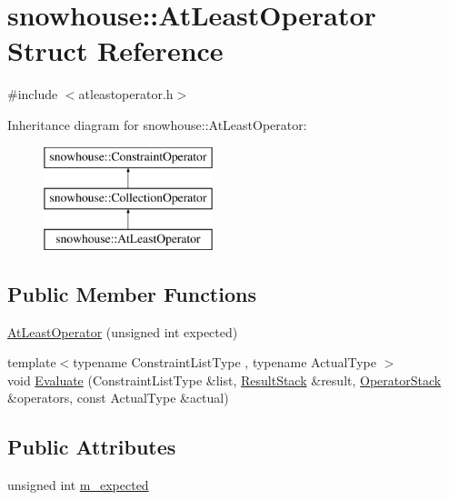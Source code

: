 \hypertarget{structsnowhouse_1_1AtLeastOperator}{}\section{snowhouse\+::At\+Least\+Operator Struct Reference}
\label{structsnowhouse_1_1AtLeastOperator}


{\ttfamily \#include $<$atleastoperator.\+h$>$}

Inheritance diagram for snowhouse\+::At\+Least\+Operator\+:\begin{figure}[H]
\begin{center}
\leavevmode
\includegraphics[height=3.000000cm]{structsnowhouse_1_1AtLeastOperator}
\end{center}
\end{figure}
\subsection*{Public Member Functions}
\begin{DoxyCompactItemize}
\item 
\mbox{\hyperlink{structsnowhouse_1_1AtLeastOperator_a451b4302344d32b1f5d09a446c45bb6a}{At\+Least\+Operator}} (unsigned int expected)
\item 
{\footnotesize template$<$typename Constraint\+List\+Type , typename Actual\+Type $>$ }\\void \mbox{\hyperlink{structsnowhouse_1_1AtLeastOperator_ab00fe1f6a697d5bb248b8d034924a56f}{Evaluate}} (Constraint\+List\+Type \&list, \mbox{\hyperlink{namespacesnowhouse_a719169b1315a13161c15f25e600a8f51}{Result\+Stack}} \&result, \mbox{\hyperlink{namespacesnowhouse_adcb10e215e6a4bbcb35722a9c7270fc6}{Operator\+Stack}} \&operators, const Actual\+Type \&actual)
\end{DoxyCompactItemize}
\subsection*{Public Attributes}
\begin{DoxyCompactItemize}
\item 
unsigned int \mbox{\hyperlink{structsnowhouse_1_1AtLeastOperator_a10580b89701c1be5eafae3b799949970}{m\+\_\+expected}}
\end{DoxyCompactItemize}
